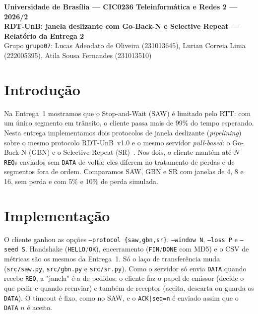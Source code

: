 \documentclass[11pt,a4paper]{article}
\begin{document}
\begin{center}
  {\large\textbf{Universidade de Brasília --- CIC0236 Teleinformática e Redes 2 --- 2026/2}}\\[0.5em]
  {\Large\textbf{RDT-UnB: janela deslizante com Go-Back-N e Selective Repeat --- Relatório da Entrega 2}}\\[0.5em]
  Grupo \texttt{grupo07}: Lucas Adeodato de Oliveira (231013645), Lurian Correia Lima (222005395), Atila Sousa Fernandes (231013510)
\end{center}

\section{Introdução}

Na Entrega~1 mostramos que o Stop-and-Wait (SAW) é limitado pelo RTT: com um
único segmento em trânsito, o cliente passa mais de 99\% do tempo esperando.
Nesta entrega implementamos dois protocolos de janela deslizante (\emph{pipelining})
sobre o mesmo protocolo RDT-UnB~v1.0 e o mesmo servidor \emph{pull-based}: o
Go-Back-N (GBN) e o Selective Repeat (SR)~\cite{kurose}. Nos dois, o cliente
mantém até $N$ \texttt{REQ}s enviados sem \texttt{DATA} de volta; eles diferem no
tratamento de perdas e de segmentos fora de ordem. Comparamos SAW, GBN e SR com
janelas de 4, 8 e 16, sem perda e com 5\% e 10\% de perda simulada.

\section{Implementação}

O cliente ganhou as opções \texttt{--protocol \{saw,gbn,sr\}}, \texttt{--window N},
\texttt{--loss P} e \texttt{--seed S}. Handshake (\texttt{HELLO}/\texttt{OK}),
encerramento (\texttt{FIN}/\texttt{DONE} com MD5) e o CSV de métricas são os
mesmos da Entrega~1. Só o laço de transferência muda
(\texttt{src/saw.py}, \texttt{src/gbn.py} e \texttt{src/sr.py}). Como o servidor
só envia \texttt{DATA} quando recebe \texttt{REQ}, a "janela" é a de pedidos: o
cliente faz o papel de emissor (decide o que pedir e quando reenviar) e também de
receptor (aceita, descarta ou guarda os \texttt{DATA}). O timeout é fixo, como no
SAW, e o \texttt{ACK|seq=n} é enviado assim que o \texttt{DATA} $n$ é aceito.
\end{document}

